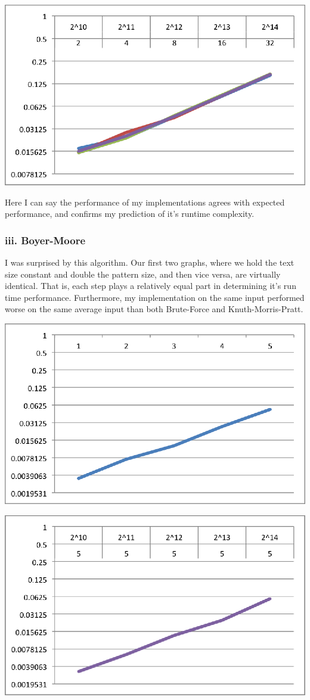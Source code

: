 \documentclass{chi2005}
\begin{document}
\includegraphics[scale=0.7]{KMPVar.eps}

Here I can say the performance of my implementations agrees with expected performance, and confirms my prediction of it's runtime complexity.

\subsubsection{iii. Boyer-Moore}

I was surprised by this algorithm. Our first two graphs, where we hold the text size constant and double the pattern size, and then vice versa, are virtually identical. That is, each step plays a relatively equal part in determining it's run time performance. Furthermore, my implementation on the same input performed worse on the same average input than both Brute-Force and Knuth-Morris-Pratt. 

\includegraphics[scale=0.7]{BMFixedM.eps}

\includegraphics[scale=0.7]{BMFixedN.eps}
\end{document}
